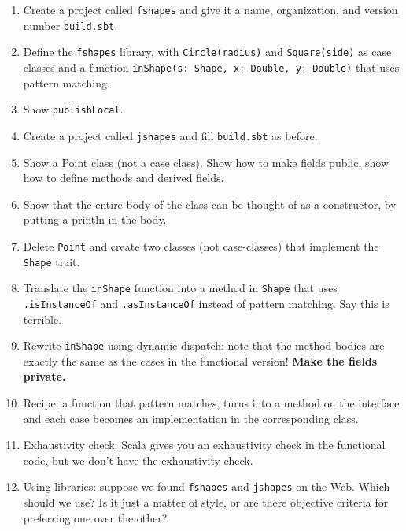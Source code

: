 \documentclass[9pt]{extbook}
\begin{document}
\begin{enumerate}

  \item Create a project called \lstinline|fshapes| and give it a
    name, organization, and version number \lstinline|build.sbt|.
    
  \item Define the \lstinline{fshapes} library, with
    \lstinline|Circle(radius)| and \lstinline|Square(side)| as case
    classes and a function \lstinline|inShape(s: Shape, x: Double, y: Double)| that
    uses pattern matching.

  \item Show \lstinline|publishLocal|.

  \item Create a project called \lstinline|jshapes| and fill \lstinline|build.sbt|
   as before.

   \item Show a Point class (not a case class). Show how to make fields
    public, show how to define methods and derived fields.

  \item Show that the entire body of the class can be thought of as a
    constructor, by putting a println in the body.

  \item Delete \lstinline|Point| and create two classes (not case-classes) that
    implement the \lstinline|Shape| trait.

  \item Translate the \lstinline|inShape| function into a method in \lstinline|Shape|
    that uses \lstinline|.isInstanceOf| and \lstinline|.asInstanceOf| instead of
    pattern matching. Say this is terrible.

  \item Rewrite \lstinline|inShape| using dynamic dispatch: note that
    the method bodies are exactly the same as the cases in the
    functional version! \textbf{Make the fields private.}

  \item Recipe: a function that pattern matches, turns into a method on the interface
    and each case becomes an implementation in the corresponding class.

  \item Exhaustivity check: Scala gives you an exhaustivity check in
    the functional code, but we don't have the exhaustivity check.

  \item Using libraries: suppose we found \lstinline|fshapes| and \lstinline|jshapes|
    on the Web. Which should we use? Is it just a matter of style, or are there objective
    criteria for preferring one over the other?


\end{enumerate}
\end{document}
